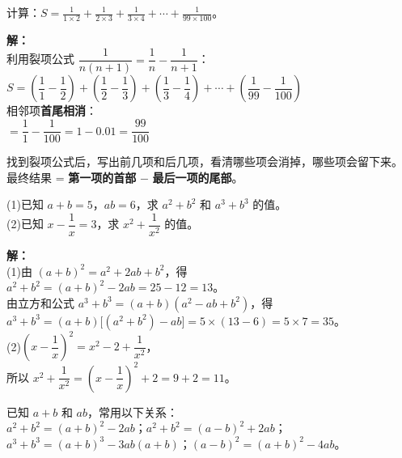 \documentclass[12pt, a4paper]{ctexart}
\begin{document}
\begin{examplebox}[【例题 7】裂项求和]
计算：$\displaystyle S = \frac{1}{1\times2} + \frac{1}{2\times3} + \frac{1}{3\times4} + \cdots + \frac{1}{99\times100}$。
\end{examplebox}

\textbf{解：}\\[3pt]
利用裂项公式 $\dfrac{1}{n(n+1)} = \dfrac{1}{n} - \dfrac{1}{n+1}$：\\[6pt]
$S = \left(\dfrac{1}{1} - \dfrac{1}{2}\right) + \left(\dfrac{1}{2} - \dfrac{1}{3}\right) + \left(\dfrac{1}{3} - \dfrac{1}{4}\right) + \cdots + \left(\dfrac{1}{99} - \dfrac{1}{100}\right)$\\[8pt]
相邻项\textbf{首尾相消}：\\
$= \dfrac{1}{1} - \dfrac{1}{100} = 1 - 0.01 = \boxed{\dfrac{99}{100}}$

\begin{tipbox}[裂项求和的关键]
找到裂项公式后，写出前几项和后几项，看清哪些项会消掉，哪些项会留下来。\\
最终结果 = \textbf{第一项的首部} $-$ \textbf{最后一项的尾部}。
\end{tipbox}

\begin{examplebox}[【例题 8】整体代换求值]
(1)\quad 已知 $a + b = 5$，$ab = 6$，求 $a^2 + b^2$ 和 $a^3 + b^3$ 的值。\\[3pt]
(2)\quad 已知 $x - \dfrac{1}{x} = 3$，求 $x^2 + \dfrac{1}{x^2}$ 的值。
\end{examplebox}

\textbf{解：}\\[3pt]
(1)\quad 由 $(a+b)^2 = a^2 + 2ab + b^2$，得\\
$a^2 + b^2 = (a+b)^2 - 2ab = 25 - 12 = \boxed{13}$。\\[6pt]
由立方和公式 $a^3+b^3 = (a+b)(a^2-ab+b^2)$，得\\
$a^3+b^3 = (a+b)\big[(a^2+b^2)-ab\big] = 5 \times (13-6) = 5\times7 = \boxed{35}$。\\[8pt]
(2)\quad $\left(x - \dfrac{1}{x}\right)^2 = x^2 - 2 + \dfrac{1}{x^2}$，\\
所以 $x^2 + \dfrac{1}{x^2} = \left(x - \dfrac{1}{x}\right)^2 + 2 = 9 + 2 = \boxed{11}$。

\begin{tipbox}[整体代换的常用恒等式]
已知 $a+b$ 和 $ab$，常用以下关系：\\
$a^2+b^2 = (a+b)^2-2ab$；\quad $a^2+b^2 = (a-b)^2+2ab$；\\
$a^3+b^3 = (a+b)^3-3ab(a+b)$；\quad $(a-b)^2 = (a+b)^2-4ab$。
\end{tipbox}
\end{document}
